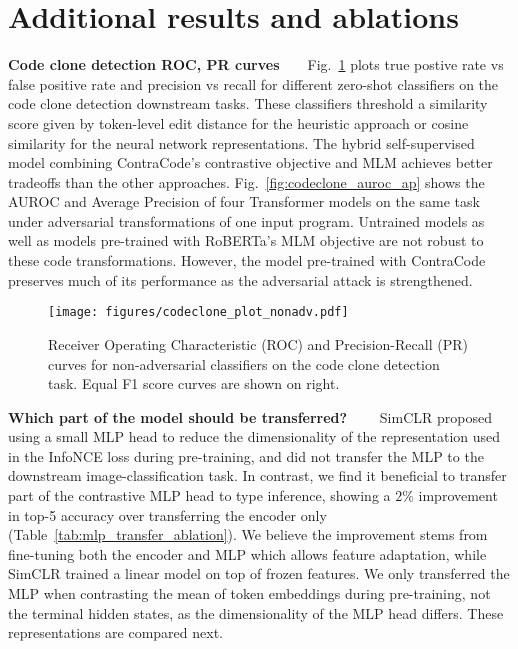 \documentclass[11pt]{article}
\newcommand{\ours}[0]{ContraCode}
\begin{document}
\section{Additional results and ablations}
\label{sec:appendix_ablations}

\textbf{Code clone detection ROC, PR curves}~~~~Fig.~\ref{fig:codeclone_curves} plots true postive rate vs false positive rate and precision vs recall for different zero-shot classifiers on the code clone detection downstream tasks. These classifiers threshold a similarity score given by token-level edit distance for the heuristic approach or cosine similarity for the neural network representations. The hybrid self-supervised model combining \ours{}'s contrastive objective and MLM achieves better tradeoffs than the other approaches. Fig.~\ref{fig:codeclone_auroc_ap} shows the AUROC and Average Precision of four Transformer models on the same task under adversarial transformations of one input program. Untrained models as well as models pre-trained with RoBERTa's MLM objective are not robust to these code transformations. However, the model pre-trained with \ours{} preserves much of its performance as the adversarial attack is strengthened.

\begin{figure}[t]
    \centering
    \texttt{[image: figures/codeclone\_plot\_nonadv.pdf]}
    \caption{Receiver Operating Characteristic (ROC) and Precision-Recall (PR) curves for non-adversarial classifiers on the code clone detection task. Equal F1 score curves are shown on right.}
    \label{fig:codeclone_curves}
\end{figure}

\textbf{Which part of the model should be transferred?}~~~~
SimCLR \citep{chen2020simple} proposed using a small MLP head to reduce the dimensionality of the representation used in the InfoNCE loss during pre-training, and did not transfer the MLP to the downstream image-classification task. In contrast, we find it beneficial to transfer part of the contrastive MLP head to type inference, showing a $2\%$ improvement in top-5 accuracy over transferring the encoder only (Table~\ref{tab:mlp_transfer_ablation}). We believe the improvement stems from fine-tuning both the encoder and MLP which allows feature adaptation, while SimCLR trained a linear model on top of frozen features. We only transferred the MLP when contrasting the mean of token embeddings during pre-training, not the terminal hidden states, as the dimensionality of the MLP head differs. These representations are compared next.
\end{document}
